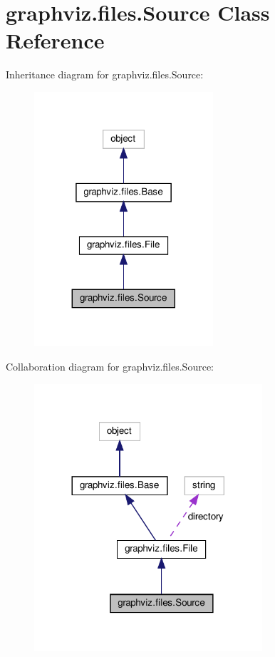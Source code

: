 \hypertarget{classgraphviz_1_1files_1_1Source}{}\section{graphviz.\+files.\+Source Class Reference}
\label{classgraphviz_1_1files_1_1Source}


Inheritance diagram for graphviz.\+files.\+Source\+:
\nopagebreak
\begin{figure}[H]
\begin{center}
\leavevmode
\includegraphics[width=188pt]{classgraphviz_1_1files_1_1Source__inherit__graph}
\end{center}
\end{figure}


Collaboration diagram for graphviz.\+files.\+Source\+:
\nopagebreak
\begin{figure}[H]
\begin{center}
\leavevmode
\includegraphics[width=240pt]{classgraphviz_1_1files_1_1Source__coll__graph}
\end{center}
\end{figure}
